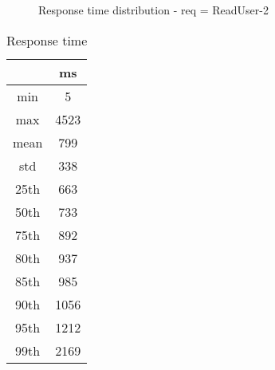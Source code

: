 \begin{minipage}{0.75\linewidth}
\begin{figure}[h]
\begin{adjustbox}{max width=1.0\linewidth, keepaspectratio}
  \end{adjustbox}
  \caption{Response time distribution - req = ReadUser-2}
\end{figure}
\end{minipage}\hfill\begin{minipage}{0.18\linewidth}
\begin{table}[h]
\begin{tabular}{|cc|}
\hline
\textbf{} & \textbf{ms}\\ \hline
 \Xhline{0.005\arrayrulewidth}
min & 5\\
 \Xhline{0.005\arrayrulewidth}
max & 4523\\
 \Xhline{0.005\arrayrulewidth}
mean & 799\\
 \Xhline{0.005\arrayrulewidth}
std & 338\\
\hline
\hline
 \Xhline{0.005\arrayrulewidth}
25th & 663\\
 \Xhline{0.005\arrayrulewidth}
50th & 733\\
 \Xhline{0.005\arrayrulewidth}
75th & 892\\
 \Xhline{0.005\arrayrulewidth}
80th & 937\\
 \Xhline{0.005\arrayrulewidth}
85th & 985\\
 \Xhline{0.005\arrayrulewidth}
90th & 1056\\
 \Xhline{0.005\arrayrulewidth}
95th & 1212\\
 \Xhline{0.005\arrayrulewidth}
99th & 2169\\
\hline
\end{tabular}
\caption{Response time}
\end{table}
\end{minipage}\hfill